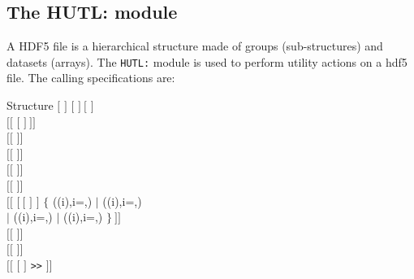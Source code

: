 \clearpage

\subsection{The HUTL: module}\label{sect:HUTLData}

A HDF5 file is a hierarchical structure made of groups (sub-structures) and datasets (arrays). The {\tt HUTL:} module is used to perform
utility actions on a {\sc hdf5} file.\cite{hdf5} The calling specifications are:

\begin{DataStructure}{Structure }
$[$  \moc{:=} $]$  $[$  $]~[$  $]$ \moc{::} \\
$[[$  $[$  $]~]]$ \\
$[[$   $]]$ \\
$[[$   $]]$ \\
$[[$   $]]$ \\
$[[$   $]]$ \\
$[[$   $[~[$  $]$  $]$ \moc{=} $\{$
((i),i=,) $|$ ((i),i=,) \\
$|$ ((i),i=,) $|$ ((i),i=,) $\}~]]$ \\
$[[$   $]]$ \\
$[[$   \moc{=}  $]]$ \\
$[[$   $[$  $]$ {\tt>>} $]]$ \moc{;} \\
\end{DataStructure}

